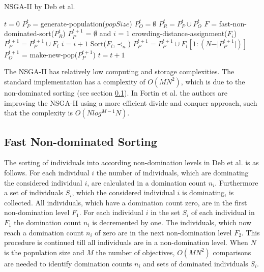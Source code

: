     \begin{algorithm}
        \caption{NSGA-II by Deb et al.\cite{Deb:2002}}
        \label{alg:NSGA2}
        \begin{algorithmic}[1]
                \State $t = 0$
                \State $P_{P}^{t}$ = generate-population($popSize$)
                \State $P_{O}^{t} = \emptyset$
                    \State $P_{R}^{t} = P_{P}^{t} \cup P_{O}^{t}$
                    \State $F$ = fast-non-dominated-sort($P_{R}^{t}$)
                    \State $P_{P}^{t+1}$ = $\emptyset$ and $i$ = 1
                        \State crowding-distance-assignment($F_i$)
                        \State $P_{P}^{t+1} = P_{P}^{t+1} \cup F_i$
                        \State $i = i + 1$
                    \EndWhile
                    \State Sort($F_i$,$\prec_n$)
                    \State $P_{P}^{t+1} = P_{P}^{t+1} \cup F_i[1:(N-\vert P_{P}^{t+1} \vert)]$
                    \State $P_{O}^{t+1}$ = make-new-pop($P_{P}^{t+1}$)
                    \State $t = t + 1$
                \EndWhile
            \EndProcedure
        \end{algorithmic}
    \end{algorithm}
    The NSGA-II has relatively low computing and storage complexities. The standard implementation has a complexity of $O(MN^2)$, which is due to the non-dominated sorting\cite{Deb:2002} (see section \ref{sec:sorting}). In Fortin et al.\cite{Fortin:2013:GIR:2463372.2463454} the authors are improving the NSGA-II using a more efficient divide and conquer approach, such that the complexity is $O(N log^{M{-}1}N)$.
    
    \subsection{Fast Non-dominated Sorting}
    \label{sec:sorting}
    The sorting of individuals into according non-domination levels in Deb et al.\cite{Deb:2002} is as follows. For each individual $i$ the number of individuals, which are dominating the considered individual $i$, are calculated in a domination count $n_i$. Furthermore a set of individuals $S_i$, which the considered individual $i$ is dominating, is collected. All individuals, which have a domination count zero, are in the first non-domination level $F_1$. For each individual $i$ in the set $S_i$ of each individual in $F_1$ the domination count $n_i$ is decremented by one. The individuals, which now reach a domination count $n_i$ of zero are in the next non-domination level $F_2$. This procedure is continued till all individuals are in a non-domination level. When $N$ is the population size and $M$ the number of objectives, $O(MN^2)$ comparisons are needed to identify domination counts $n_i$ and sets of dominated individuals $S_i$.
    
